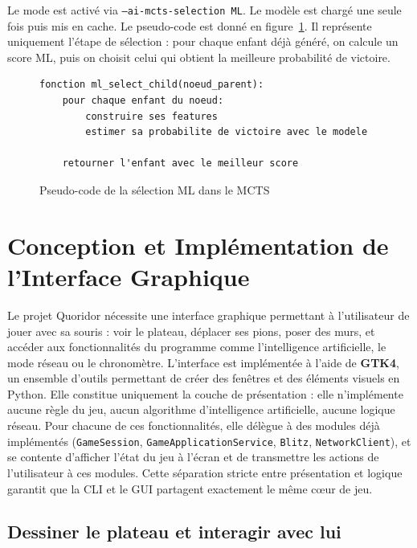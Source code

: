 \documentclass[a4paper]{article}
\begin{document}
Le mode est activé via \texttt{--ai-mcts-selection ML}. Le modèle est chargé
une seule fois puis mis en cache. Le pseudo-code est donné en
figure~\ref{fig:ml-select-pseudocode}. Il représente uniquement l'étape de
sélection : pour chaque enfant déjà généré, on calcule un score ML, puis on
choisit celui qui obtient la meilleure probabilité de victoire.

\begin{figure}[H]
{\small
\begin{verbatim}
fonction ml_select_child(noeud_parent):
    pour chaque enfant du noeud:
        construire ses features
        estimer sa probabilite de victoire avec le modele

    retourner l'enfant avec le meilleur score
\end{verbatim}
}
\caption{Pseudo-code de la sélection ML dans le MCTS}
\label{fig:ml-select-pseudocode}
\end{figure}

\section{Conception et Implémentation de l'Interface Graphique}

Le projet Quoridor nécessite une interface graphique permettant à
l'utilisateur de jouer avec sa souris : voir le plateau, déplacer ses
pions, poser des murs, et accéder aux fonctionnalités du programme
comme l'intelligence artificielle, le mode réseau ou le chronomètre.
L'interface est implémentée à l'aide de \textbf{GTK4}, un
ensemble d'outils permettant de créer des fenêtres et des éléments
visuels en Python. Elle constitue uniquement la couche de présentation :
elle n'implémente aucune règle du jeu, aucun algorithme d'intelligence
artificielle, aucune logique réseau. Pour chacune de ces fonctionnalités,
elle délègue à des modules déjà implémentés (\texttt{GameSession},
\texttt{GameApplicationService}, \texttt{Blitz}, \texttt{NetworkClient}),
et se contente d'afficher l'état du jeu à l'écran et de transmettre
les actions de l'utilisateur à ces modules. Cette séparation stricte
entre présentation et logique garantit que la CLI et le GUI partagent
exactement le même cœur de jeu.

\subsection{Dessiner le plateau et interagir avec lui}
\end{document}
